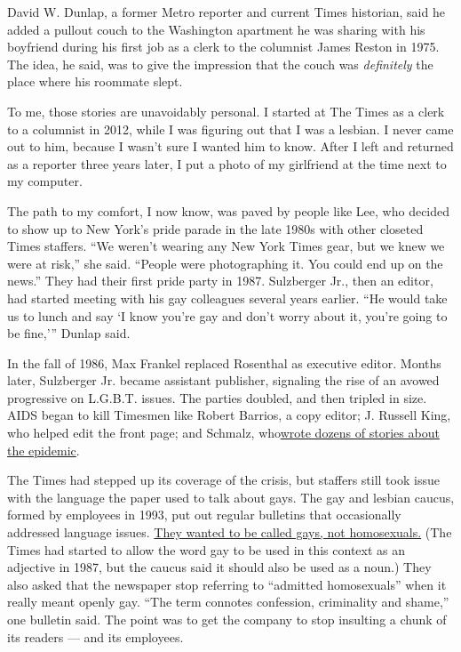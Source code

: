 David W. Dunlap, a former Metro reporter and current Times historian,
said he added a pullout couch to the Washington apartment he was sharing
with his boyfriend during his first job as a clerk to the columnist
James Reston in 1975. The idea, he said, was to give the impression that
the couch was \emph{definitely} the place where his roommate slept.

To me, those stories are unavoidably personal. I started at The Times as
a clerk to a columnist in 2012, while I was figuring out that I was a
lesbian. I never came out to him, because I wasn't sure I wanted him to
know. After I left and returned as a reporter three years later, I put a
photo of my girlfriend at the time next to my computer.

The path to my comfort, I now know, was paved by people like Lee, who
decided to show up to New York's pride parade in the late 1980s with
other closeted Times staffers. ``We weren't wearing any New York Times
gear, but we knew we were at risk,'' she said. ``People were
photographing it. You could end up on the news.'' They had their first
pride party in 1987. Sulzberger Jr., then an editor, had started meeting
with his gay colleagues several years earlier. ``He would take us to
lunch and say `I know you're gay and don't worry about it, you're going
to be fine,''' Dunlap said.

In the fall of 1986, Max Frankel replaced Rosenthal as executive editor.
Months later, Sulzberger Jr. became assistant publisher, signaling the
rise of an avowed progressive on L.G.B.T. issues. The parties doubled,
and then tripled in size. AIDS began to kill Timesmen like Robert
Barrios, a copy editor; J. Russell King, who helped edit the front page;
and Schmalz,
who\href{https://www.nytimes3xbfgragh.onion/1993/11/07/obituaries/jeffrey-schmalz-39-times-writer-on-politics-and-then-aids-dies.html}{wrote
dozens of stories about the epidemic}.

The Times had stepped up its coverage of the crisis, but staffers still
took issue with the language the paper used to talk about gays. The gay
and lesbian caucus, formed by employees in 1993, put out regular
bulletins that occasionally addressed language issues.
\href{https://www.nytimes3xbfgragh.onion/2014/03/23/fashion/gays-lesbians-the-term-homosexual.html}{They
wanted to be called gays, not homosexuals.} (The Times had started to
allow the word gay to be used in this context as an adjective in 1987,
but the caucus said it should also be used as a noun.) They also asked
that the newspaper stop referring to ``admitted homosexuals'' when it
really meant openly gay. ``The term connotes confession, criminality and
shame,'' one bulletin said. The point was to get the company to stop
insulting a chunk of its readers --- and its employees.

